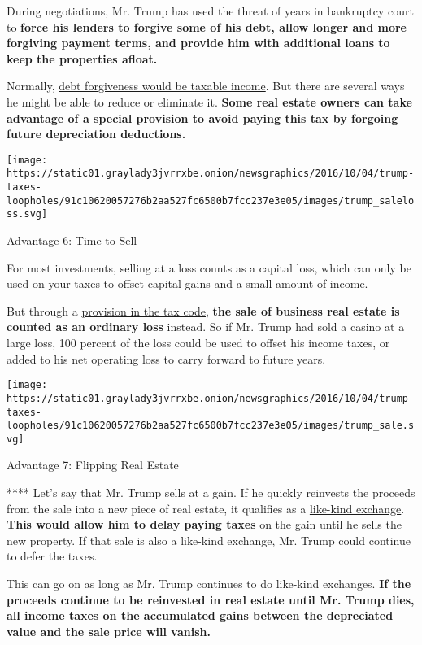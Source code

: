 During negotiations, Mr. Trump has used the threat of years in
bankruptcy court to \textbf{force his lenders to forgive some of his
debt, allow longer and more forgiving payment terms, and provide him
with additional loans to keep the properties afloat.}

Normally, \href{https://www.irs.gov/taxtopics/tc431.html}{debt
forgiveness would be taxable income}. But there are several ways he
might be able to reduce or eliminate it. \textbf{Some real estate owners
can take advantage of a special provision to avoid paying this tax by
forgoing future depreciation deductions.}

\texttt{[image: https://static01.graylady3jvrrxbe.onion/newsgraphics/2016/10/04/trump-taxes-loopholes/91c10620057276b2aa527fc6500b7fcc237e3e05/images/trump\_saleloss.svg]}

Advantage 6: Time to Sell

For most investments, selling at a loss counts as a capital loss, which
can only be used on your taxes to offset capital gains and a small
amount of income.

But through a
\href{https://www.irs.gov/publications/p544/ch03.html}{provision in the
tax code}, \textbf{the sale of business real estate is counted as an
ordinary loss} instead. So if Mr. Trump had sold a casino at a large
loss, 100 percent of the loss could be used to offset his income taxes,
or added to his net operating loss to carry forward to future years.

\texttt{[image: https://static01.graylady3jvrrxbe.onion/newsgraphics/2016/10/04/trump-taxes-loopholes/91c10620057276b2aa527fc6500b7fcc237e3e05/images/trump\_sale.svg]}

Advantage 7: Flipping Real Estate

**** Let's say that Mr. Trump sells at a gain. If he quickly reinvests
the proceeds from the sale into a new piece of real estate, it qualifies
as a
\href{https://www.irs.gov/uac/like-kind-exchanges-under-irc-code-section-1031}{like-kind
exchange}. \textbf{This would allow him to delay paying taxes} on the
gain until he sells the new property. If that sale is also a like-kind
exchange, Mr. Trump could continue to defer the taxes.

This can go on as long as Mr. Trump continues to do like-kind exchanges.
\textbf{If the proceeds continue to be reinvested in real estate until
Mr. Trump dies, all income taxes on the accumulated gains between the
depreciated value and the sale price will vanish.}


